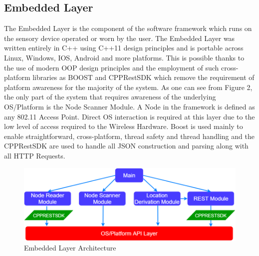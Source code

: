 \documentclass[conference]{IEEEtran}
\begin{document}
\subsection{Embedded Layer}
The Embedded Layer is the component of the software framework which runs on the sensory device operated or worn by the user. The Embedded Layer was written entirely in C++ using C++11 design principles and is portable across Linux, Windows, IOS, Android and more platforms. This is possible thanks to the use of modern OOP design principles and the employment of such cross-platform libraries as BOOST and CPPRestSDK which remove the requirement of platform awareness for the majority of the system. As one can see from Figure 2, the only part of the system that requires awareness of the underlying OS/Platform is the Node Scanner Module. A Node in the framework is defined as any 802.11 Access Point. Direct OS interaction is required at this layer due to the low level of access required to the Wireless Hardware.
Boost is used mainly to enable straightforward, cross-platform, thread safety and thread handling and the CPPRestSDK are used to handle all JSON construction and parsing along with all HTTP Requests.
\begin{figure}[H]
    \includegraphics[width=9 cm,height=3.5 cm]{Pink_Panther_Architecture.png}
    \caption{Embedded Layer Architecture}
    \end{figure}
\end{document}
